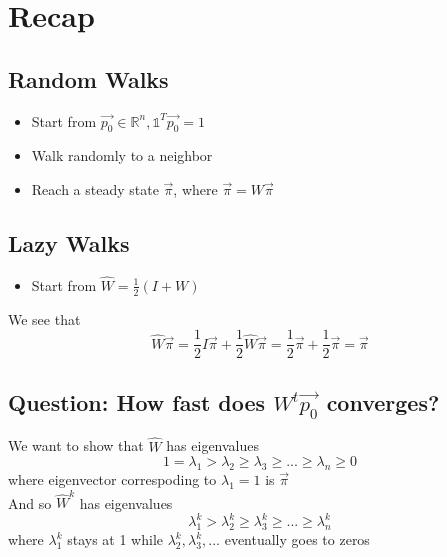 \documentclass[12pt]{article}
\begin{document}
\MakeScribeTop

\section{Recap}



\subsection{Random Walks}
\begin{itemize}
  \item Start from $\vec{p_0} \in \mathbb{R}^n, \mathds{1}^T\vec{p_0} =1$
  \item Walk randomly to a neighbor
  \item Reach a steady state $\vec{\pi}$, where $\vec{\pi} = W\vec{\pi}$
\end{itemize}

\subsection{Lazy Walks}
\begin{itemize}
  \item Start from $\widehat{W} = \frac{1}{2}(I + W)$
\end{itemize}
We see that $$\widehat{W}\vec{\pi} = \frac{1}{2}I\vec{\pi} + \frac{1}{2}\widehat{W}\vec{\pi} =  \frac{1}{2}\vec{\pi}+ \frac{1}{2}\vec{\pi} = \vec{\pi}  $$
\subsection{Question: How fast does $W^t\vec{p_0}$ converges?}
We want to show that  $\widehat{W}$ has eigenvalues 
$$1 = \lambda_1 > \lambda_2 \geq \lambda_3 \geq ... \geq \lambda_n \geq 0$$
where eigenvector correspoding to $\lambda_1 = 1$ is $\vec{\pi}$\\
And so $\widehat{W}^k$ has eigenvalues $$\lambda_1^k > \lambda_2^k \geq \lambda_3^k \geq ... \geq \lambda_n^k$$
where $\lambda_1^k$ stays at 1 while $\lambda_2^k, \lambda_3^k, ... $ eventually goes to zeros
\end{document}
